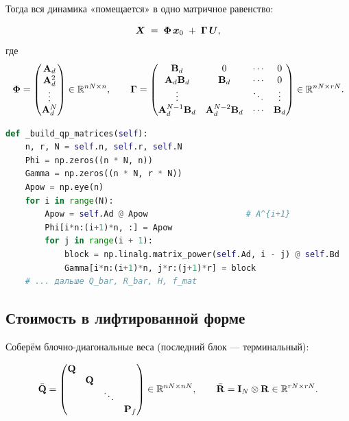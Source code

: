 Тогда вся динамика «помещается» в одно матричное равенство:

\begin{formulabox}[title={Лифтированная динамика}]
\begin{equation}
  \bm{X} \;=\; \mathbf{\Phi}\,\bm{x}_0 \;+\; \mathbf{\Gamma}\,\bm{U},
  \label{eq:lifted}
\end{equation}
где
\[
  \mathbf{\Phi} = \begin{pmatrix}
    \mathbf{A}_d\\ \mathbf{A}_d^2\\ \vdots\\ \mathbf{A}_d^N
  \end{pmatrix} \in \mathbb{R}^{nN \times n},
  \qquad
  \mathbf{\Gamma} = \begin{pmatrix}
    \mathbf{B}_d & 0 & \cdots & 0\\
    \mathbf{A}_d\mathbf{B}_d & \mathbf{B}_d & \cdots & 0\\
    \vdots & & \ddots & \vdots\\
    \mathbf{A}_d^{N-1}\mathbf{B}_d & \mathbf{A}_d^{N-2}\mathbf{B}_d & \cdots & \mathbf{B}_d
  \end{pmatrix} \in \mathbb{R}^{nN \times rN}.
\]
\end{formulabox}

\begin{codebox}[title={\filepath{pi\_nodes/control/mpc\_controller.py:134}}]
\begin{lstlisting}[language=Python]
def _build_qp_matrices(self):
    n, r, N = self.n, self.r, self.N
    Phi = np.zeros((n * N, n))
    Gamma = np.zeros((n * N, r * N))
    Apow = np.eye(n)
    for i in range(N):
        Apow = self.Ad @ Apow                    # A^{i+1}
        Phi[i*n:(i+1)*n, :] = Apow
        for j in range(i + 1):
            block = np.linalg.matrix_power(self.Ad, i - j) @ self.Bd
            Gamma[i*n:(i+1)*n, j*r:(j+1)*r] = block
    # ... дальше Q_bar, R_bar, H, f_mat
\end{lstlisting}
\end{codebox}

\subsection{Стоимость в лифтированной форме}

Соберём блочно-диагональные веса (последний блок --- терминальный):

\[
  \bar{\mathbf{Q}} = \begin{pmatrix}
    \mathbf{Q} &       &        & \\
            & \mathbf{Q} &      & \\
            &       & \ddots & \\
            &       &        & \mathbf{P}_f
  \end{pmatrix} \in \mathbb{R}^{nN\times nN},
  \qquad
  \bar{\mathbf{R}} = \mathbf{I}_N \otimes \mathbf{R} \in \mathbb{R}^{rN\times rN}.
\]


